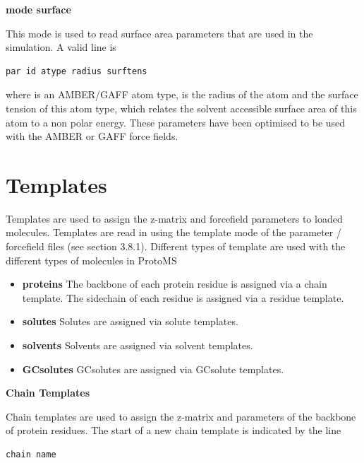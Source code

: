 \documentclass[letterpaper,10pt,english]{sphinxmanual}
\begin{document}
\textbf{mode surface}

This mode is used to read surface area parameters that are used in the simulation. A valid line is

\begin{Verbatim}[commandchars=\\\{\}]
par id atype radius surftens
\end{Verbatim}

where  is an AMBER/GAFF atom type,  is the radius of the atom and  the surface tension of this atom type, which relates the solvent accessible surface area of this atom to a non polar energy. These parameters have been optimised to be used with the AMBER or GAFF force fields.


\section{Templates}
\label{protoms:templates}
Templates are used to assign the z-matrix and forcefield parameters to loaded molecules. Templates are read in using the template mode of the parameter / forcefield files (see section 3.8.1). Different types of template are used with the different types of molecules in ProtoMS
\begin{itemize}
\item {} 
\textbf{proteins} The backbone of each protein residue is assigned via a chain template. The sidechain of each residue is assigned via a residue template.

\item {} 
\textbf{solutes} Solutes are assigned via solute templates.

\item {} 
\textbf{solvents} Solvents are assigned via solvent templates.

\item {} 
\textbf{GCsolutes} GCsolutes are assigned via GCsolute templates.

\end{itemize}

\textbf{Chain Templates}

Chain templates are used to assign the z-matrix and parameters of the backbone of protein residues. The start of a new chain template is indicated by the line

\begin{Verbatim}[commandchars=\\\{\}]
chain name
\end{Verbatim}
\end{document}
